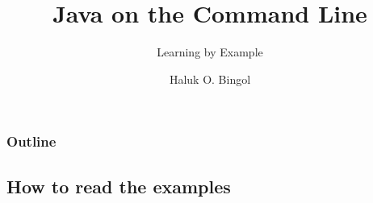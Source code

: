 \documentclass[aspectratio=169,10pt,compress]{beamer}
\title{Java on the Command Line}
\subtitle{Learning by Example}
\author[Bingol]{Haluk O. Bingol}
\institute[FCIS]{
    Faculty of Computer and Information Sciences\\
    Yeditepe University
}
\date{
	{\tiny \hbTimeStamp}
}
\begin{document}
\begin{frame}[t,fragile]
  \titlepage
\end{frame}




\begin{frame}[t,fragile] \frametitle{Outline}
  \tableofcontents[hideallsubsections]
\end{frame}


\subsection[Read]{How to read the examples}
\end{document}
